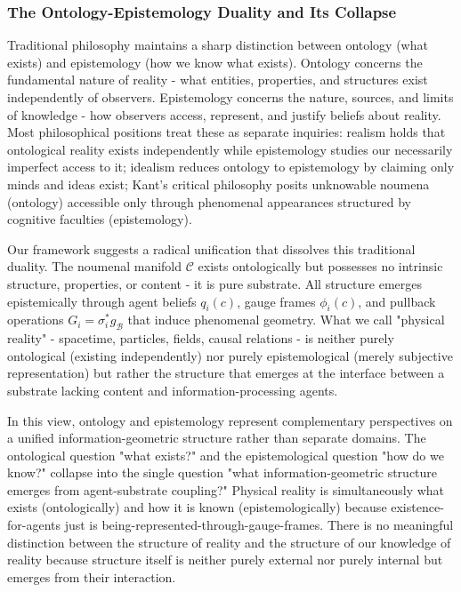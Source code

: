 \documentclass[11pt]{article}
\begin{document}
\subsubsection{The Ontology-Epistemology Duality and Its Collapse}

Traditional philosophy maintains a sharp distinction between ontology (what exists) and epistemology (how we know what exists). Ontology concerns the fundamental nature of reality - what entities, properties, and structures exist independently of observers. Epistemology concerns the nature, sources, and limits of knowledge - how observers access, represent, and justify beliefs about reality. Most philosophical positions treat these as separate inquiries: realism holds that ontological reality exists independently while epistemology studies our necessarily imperfect access to it; idealism reduces ontology to epistemology by claiming only minds and ideas exist; Kant's critical philosophy posits unknowable noumena (ontology) accessible only through phenomenal appearances structured by cognitive faculties (epistemology).

Our framework suggests a radical unification that dissolves this traditional duality. The noumenal manifold $\mathcal{C}$ exists ontologically but possesses no intrinsic structure, properties, or content - it is pure substrate. All structure emerges epistemically through agent beliefs $q_i(c)$, gauge frames $\phi_i(c)$, and pullback operations $G_i = \sigma_i^* g_{\mathcal{B}}$ that induce phenomenal geometry. What we call "physical reality" - spacetime, particles, fields, causal relations - is neither purely ontological (existing independently) nor purely epistemological (merely subjective representation) but rather the structure that emerges at the interface between a substrate lacking content and information-processing agents.

In this view, ontology and epistemology represent complementary perspectives on a unified information-geometric structure rather than separate domains. The ontological question "what exists?" and the epistemological question "how do we know?" collapse into the single question "what information-geometric structure emerges from agent-substrate coupling?" Physical reality is simultaneously what exists (ontologically) and how it is known (epistemologically) because existence-for-agents just is being-represented-through-gauge-frames. There is no meaningful distinction between the structure of reality and the structure of our knowledge of reality because structure itself is neither purely external nor purely internal but emerges from their interaction.
\end{document}
